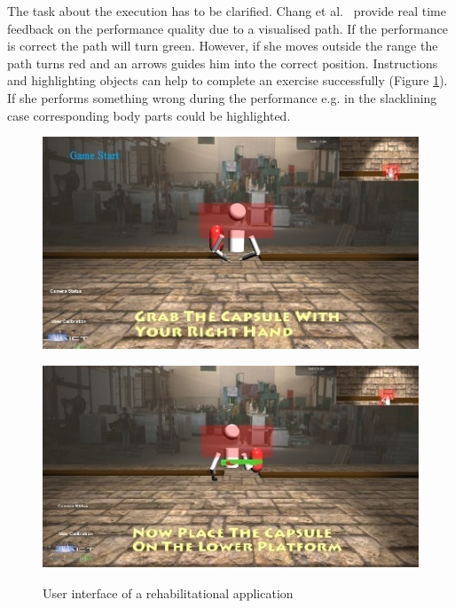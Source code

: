 The task about the execution has to be clarified. Chang et al.~\cite{Chang2012-hz} provide real time feedback on the performance quality due to a visualised path. If the performance is correct the path will turn green. However, if she moves outside the range the path turns red and an arrows guides him into the correct position. Instructions and highlighting objects can help to complete an exercise successfully (Figure \ref{fig:gameUIChang}). If she performs something wrong during the performance e.g. in the slacklining case corresponding body parts could be highlighted.
\begin{figure}[htb]
	\centering
	\begin{minipage}[t]{0.49\linewidth}
		\centering
		\includegraphics[width=1\linewidth]{Pictures/gameInstruction}
		\label{fig:gameInstruction}
	\end{minipage}
	\hfill
	\begin{minipage}[t]{0.49\linewidth}
		\centering
		\includegraphics[width=1\linewidth]{Pictures/gameHighlighting}
		\label{fig:gameHighlighting}
	\end{minipage}
	\caption{User interface of a rehabilitational application~\cite{Chang2012-hz}}
	\label{fig:gameUIChang}
\end{figure}

